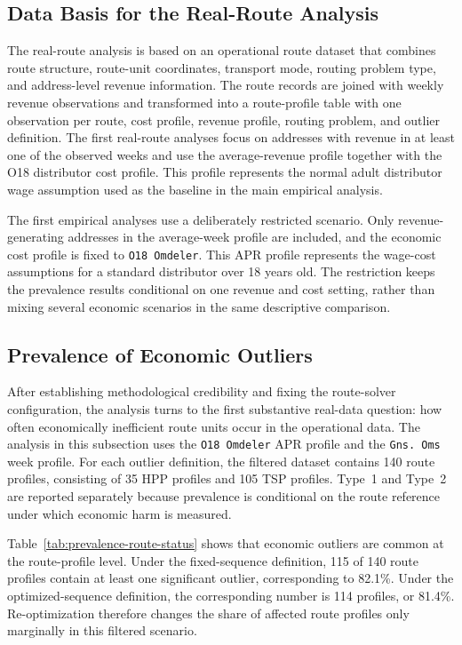 \documentclass[preprint,12pt]{elsarticle}
\begin{document}
\subsection*{Data Basis for the Real-Route Analysis}

The real-route analysis is based on an operational route dataset that combines route structure, route-unit coordinates, transport mode, routing problem type, and address-level revenue information. The route records are joined with weekly revenue observations and transformed into a route-profile table with one observation per route, cost profile, revenue profile, routing problem, and outlier definition. The first real-route analyses focus on addresses with revenue in at least one of the observed weeks and use the average-revenue profile together with the O18 distributor cost profile. This profile represents the normal adult distributor wage assumption used as the baseline in the main empirical analysis.

The first empirical analyses use a deliberately restricted scenario. Only revenue-generating addresses in the average-week profile are included, and the economic cost profile is fixed to \texttt{O18 Omdeler}. This APR profile represents the wage-cost assumptions for a standard distributor over 18 years old. The restriction keeps the prevalence results conditional on one revenue and cost setting, rather than mixing several economic scenarios in the same descriptive comparison.

\subsection{Prevalence of Economic Outliers}
\label{subsec:prevalence-of-economic-outliers}

After establishing methodological credibility and fixing the route-solver configuration, the analysis turns to the first substantive real-data question: how often economically inefficient route units occur in the operational data. The analysis in this subsection uses the \texttt{O18 Omdeler} APR profile and the \texttt{Gns. Oms} week profile. For each outlier definition, the filtered dataset contains 140 route profiles, consisting of 35 HPP profiles and 105 TSP profiles. Type~1 and Type~2 are reported separately because prevalence is conditional on the route reference under which economic harm is measured.

Table~\ref{tab:prevalence-route-status} shows that economic outliers are common at the route-profile level. Under the fixed-sequence definition, 115 of 140 route profiles contain at least one significant outlier, corresponding to 82.1\%. Under the optimized-sequence definition, the corresponding number is 114 profiles, or 81.4\%. Re-optimization therefore changes the share of affected route profiles only marginally in this filtered scenario.
\end{document}

